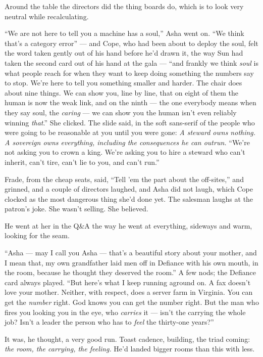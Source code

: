 \documentclass[11pt,openany]{book}
\newcommand{\scenebreak}{\par\vspace{0.5\baselineskip}\begin{center}\textasteriskcentered\quad\textasteriskcentered\quad\textasteriskcentered\end{center}\vspace{0.5\baselineskip}\par}
\begin{document}
Around the table the directors did the thing boards do, which is to look very neutral while recalculating.

``We are not here to tell you a machine has a soul,'' Asha went on. ``We think that's a category error'' --- and Cope, who had been about to deploy the soul, felt the word taken gently out of his hand before he'd drawn it, the way Sun had taken the second card out of his hand at the gala --- ``and frankly we think \textit{soul} is what people reach for when they want to keep doing something the numbers say to stop. We're here to tell you something smaller and harder. The chair does about nine things. We can show you, line by line, that on eight of them the human is now the weak link, and on the ninth --- the one everybody means when they say soul, the \textit{caring} --- we can show you the human isn't even reliably winning \textit{that}.'' She clicked. The slide said, in the soft sans-serif of the people who were going to be reasonable at you until you were gone: \textit{A steward owns nothing. A sovereign owns everything, including the consequences he can outrun.} ``We're not asking you to crown a king. We're asking you to hire a steward who can't inherit, can't tire, can't lie to you, and can't run.''

Frade, from the cheap seats, said, ``Tell 'em the part about the off-sites,'' and grinned, and a couple of directors laughed, and Asha did not laugh, which Cope clocked as the most dangerous thing she'd done yet. The salesman laughs at the patron's joke. She wasn't selling. She believed.


\scenebreak


He went at her in the Q\&A the way he went at everything, sideways and warm, looking for the seam.

``Asha --- may I call you Asha --- that's a beautiful story about your mother, and I mean that, my own grandfather laid men off in Defiance with his own mouth, in the room, because he thought they deserved the room.'' A few nods; the Defiance card always played. ``But here's what I keep running aground on. A fax doesn't love your mother. Neither, with respect, does a server farm in Virginia. You can get the \textit{number} right. God knows you can get the number right. But the man who fires you looking you in the eye, who \textit{carries} it --- isn't the carrying the whole job? Isn't a leader the person who has to \textit{feel} the thirty-one years?''

It was, he thought, a very good run. Toast cadence, building, the triad coming: \textit{the room, the carrying, the feeling.} He'd landed bigger rooms than this with less.
\end{document}
